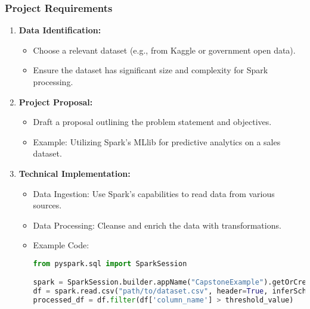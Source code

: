 \documentclass[aspectratio=169]{beamer}
\begin{document}
\begin{frame}[fragile]
    \frametitle{Project Requirements}
    \begin{enumerate}
        \item \textbf{Data Identification:}
            \begin{itemize}
                \item Choose a relevant dataset (e.g., from Kaggle or government open data).
                \item Ensure the dataset has significant size and complexity for Spark processing.
            \end{itemize}
        \item \textbf{Project Proposal:}
            \begin{itemize}
                \item Draft a proposal outlining the problem statement and objectives.
                \item Example: Utilizing Spark’s MLlib for predictive analytics on a sales dataset.
            \end{itemize}
        \item \textbf{Technical Implementation:}
            \begin{itemize}
                \item Data Ingestion: Use Spark's capabilities to read data from various sources.
                \item Data Processing: Cleanse and enrich the data with transformations.
                \item Example Code:
                \begin{lstlisting}[language=python]
from pyspark.sql import SparkSession

spark = SparkSession.builder.appName("CapstoneExample").getOrCreate()
df = spark.read.csv("path/to/dataset.csv", header=True, inferSchema=True)
processed_df = df.filter(df['column_name'] > threshold_value)
                \end{lstlisting}
            \end{itemize}
    \end{enumerate}
\end{frame}
\end{document}
